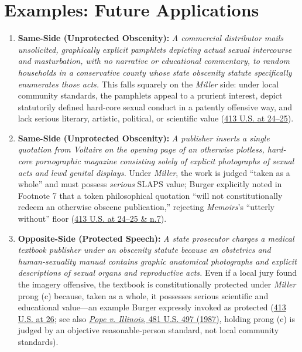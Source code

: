 \documentclass[12pt]{article}
\begin{document}
\section{Examples: Future Applications}
\begin{enumerate}
\item \textbf{Same-Side (Unprotected Obscenity):} \textit{A commercial distributor mails unsolicited, graphically explicit pamphlets depicting actual sexual intercourse and masturbation, with no narrative or educational commentary, to random households in a conservative county whose state obscenity statute specifically enumerates those acts.} This falls squarely on the \textit{Miller} side: under local community standards, the pamphlets appeal to a prurient interest, depict statutorily defined hard-core sexual conduct in a patently offensive way, and lack serious literary, artistic, political, or scientific value (\href{https://supreme.justia.com/cases/federal/us/413/15/}{413 U.S. at 24--25}).

\item \textbf{Same-Side (Unprotected Obscenity):} \textit{A publisher inserts a single quotation from Voltaire on the opening page of an otherwise plotless, hard-core pornographic magazine consisting solely of explicit photographs of sexual acts and lewd genital displays.} Under \textit{Miller}, the work is judged ``taken as a whole'' and must possess \textit{serious} SLAPS value; Burger explicitly noted in Footnote 7 that a token philosophical quotation ``will not constitutionally redeem an otherwise obscene publication,'' rejecting \textit{Memoirs}'s ``utterly without'' floor (\href{https://supreme.justia.com/cases/federal/us/413/15/}{413 U.S. at 24--25 \& n.7}).

\item \textbf{Opposite-Side (Protected Speech):} \textit{A state prosecutor charges a medical textbook publisher under an obscenity statute because an obstetrics and human-sexuality manual contains graphic anatomical photographs and explicit descriptions of sexual organs and reproductive acts.} Even if a local jury found the imagery offensive, the textbook is constitutionally protected under \textit{Miller} prong (c) because, taken as a whole, it possesses serious scientific and educational value---an example Burger expressly invoked as protected (\href{https://supreme.justia.com/cases/federal/us/413/15/}{413 U.S. at 26}; see also \href{https://supreme.justia.com/cases/federal/us/481/497/}{\textit{Pope v. Illinois}, 481 U.S. 497 (1987)}, holding prong (c) is judged by an objective reasonable-person standard, not local community standards).


\end{enumerate}
\end{document}
